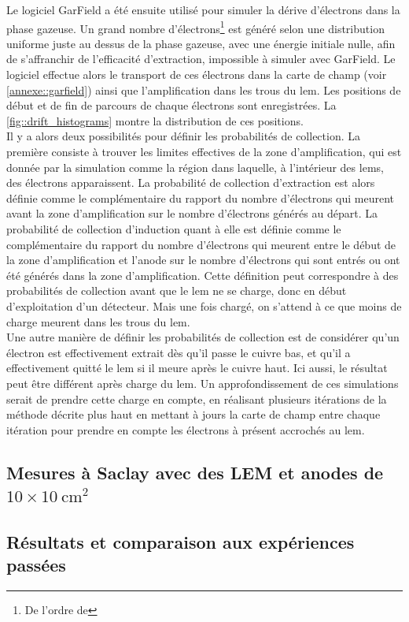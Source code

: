             Le logiciel GarField a été ensuite utilisé pour simuler la dérive d'électrons dans la phase gazeuse. Un grand nombre d'électrons\footnote{De l'ordre de } est généré selon une distribution uniforme juste au dessus de la phase gazeuse, avec une énergie initiale nulle, afin de s'affranchir de l'efficacité d'extraction, impossible à simuler avec GarField. Le logiciel effectue alors le transport de ces électrons dans la carte de champ (voir \autoref{annexe::garfield}) ainsi que l'amplification dans les trous du \gls{lem}. Les positions de début et de fin de parcours de chaque électrons sont enregistrées. La \autoref{fig::drift_histograms} montre la distribution de ces positions.\\
            
            Il y a alors deux possibilités pour définir les probabilités de collection. La première consiste à trouver les limites effectives de la zone d'amplification, qui est donnée par la simulation comme la région dans laquelle, à l'intérieur des \glspl{lem}, des électrons apparaissent. La probabilité de collection d'extraction est alors définie comme le complémentaire du rapport du nombre d'électrons qui meurent avant la zone d'amplification sur le nombre d'électrons générés au départ. La probabilité de collection d'induction quant à elle est définie comme le complémentaire du rapport du nombre d'électrons qui meurent entre le début de la zone d'amplification et l'anode sur le nombre d'électrons qui sont entrés ou ont été générés dans la zone d'amplification. Cette définition peut correspondre à des probabilités de collection avant que le \gls{lem} ne se charge, donc en début d'exploitation d'un détecteur. Mais une fois chargé, on s'attend à ce que moins de charge meurent dans les trous du \gls{lem}.\\
            
            Une autre manière de définir les probabilités de collection est de considérer qu'un électron est effectivement extrait dès qu'il passe le cuivre bas, et qu'il a effectivement quitté le \gls{lem} si il meure après le cuivre haut. Ici aussi, le résultat peut être différent après charge du \gls{lem}. Un approfondissement de ces simulations serait de prendre cette charge en compte, en réalisant plusieurs itérations de la méthode décrite plus haut en mettant à jours la carte de champ entre chaque itération pour prendre en compte les électrons à présent accrochés au \gls{lem}.\\
            
            
            
        \subsection{Mesures à Saclay avec des LEM et anodes de $10\times\SI{10}{\cm\squared}$ }
        
        \subsection{Résultats et comparaison aux expériences passées}